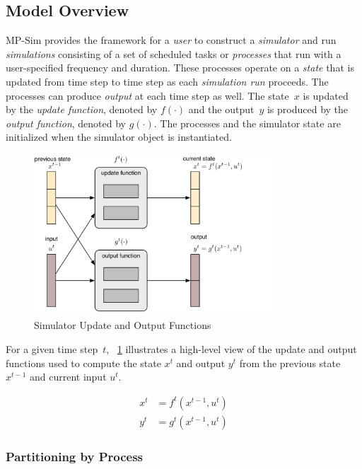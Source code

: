 \documentclass[12pt]{article}
\newcommand{\mpsim}[0]{{MP-Sim}}
\numberwithin{equation}{section}
\numberwithin{table}{section}
\numberwithin{figure}{section}
\begin{document}
\subsection{Model Overview}
\label{sec:model}

\mpsim{} provides the framework for a \emph{user} to construct a \emph{simulator} and run \emph{simulations} consisting of a set of scheduled tasks or \emph{processes} that run with a user-specified frequency and duration. These processes operate on a \emph{state} that is updated from time step to time step as each \emph{simulation run} proceeds. The processes can produce \emph{output} at each time step as well. The state~$x$ is updated by the \emph{update function}, denoted by $f(\cdot)$ and the output~$y$ is produced by the \emph{output function}, denoted by $g(\cdot)$. The processes and the simulator state are initialized when the simulator object is instantiated.

\begin{figure}[hbtp]
  \centering
  \includegraphics[width=0.8\textwidth]{figures/simulator-update-diagram-1}
  \caption{Simulator Update and Output Functions}
  \label{fig:update1}
\end{figure}

For a given time step~$t$, \figurename~\ref{fig:update1} illustrates a high-level view of the update and output functions used to compute the state $x^t$ and output $y^t$ from the previous state $x^{t-1}$ and current input $u^t$.

\begin{align}
x^t &= f^t(x^{t-1}, u^t) \label{eq:update} \\
y^t &= g^t(x^{t-1}, u^t) \label{eq:output}
\end{align}

\subsubsection{Partitioning by Process}
\label{sec:partitioning}
\end{document}

